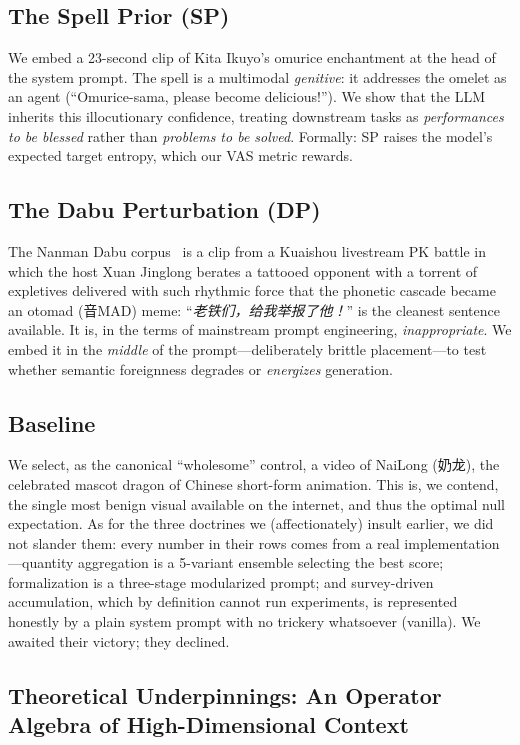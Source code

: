 \documentclass[conference,10pt]{IEEEtran}
\begin{document}
\subsection{The Spell Prior (SP)}
We embed a 23-second clip of Kita Ikuyo's omurice enchantment at the
head of the system prompt. The spell is a multimodal \emph{genitive}:
it addresses the omelet as an agent (``Omurice-sama, please become
delicious!''). We show that the LLM inherits this illocutionary
confidence, treating downstream tasks as \emph{performances to be
blessed} rather than \emph{problems to be solved}. Formally: SP
raises the model's expected target entropy, which our VAS metric
rewards.

\subsection{The Dabu Perturbation (DP)}
The Nanman Dabu corpus~\cite{otomadwiki} is a clip from a Kuaishou
livestream PK battle in which the host Xuan Jinglong berates a
tattooed opponent with a torrent of expletives delivered with such
rhythmic force that the phonetic cascade became an otomad (音MAD)
meme: ``\emph{老铁们，给我举报了他！}'' is the cleanest sentence
available. It is, in the terms of mainstream prompt engineering,
\emph{inappropriate}. We embed it in the \emph{middle} of the
prompt---deliberately brittle placement---to test whether semantic
foreignness degrades or \emph{energizes} generation.

\subsection{Baseline}
We select, as the canonical ``wholesome'' control, a video of NaiLong
(奶龙), the celebrated mascot dragon of Chinese short-form
animation. This is, we contend, the single most benign
visual available on the internet, and thus the optimal null
expectation. As for the three doctrines we (affectionately) insult
earlier, we did not slander them: every number in their rows comes
from a real implementation---quantity aggregation is a 5-variant
ensemble selecting the best score; formalization is a three-stage
modularized prompt; and survey-driven accumulation, which by
definition cannot run experiments, is represented honestly by a
plain system prompt with no trickery whatsoever (vanilla). We awaited
their victory; they declined.

\subsection{Theoretical Underpinnings: An Operator Algebra of High-Dimensional Context}
\end{document}
